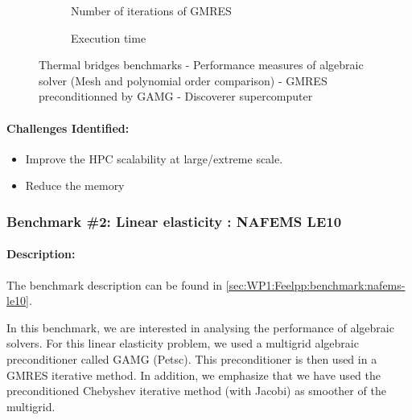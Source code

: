 \begin{figure}
  \begin{subfigure}[c]{\textwidth}
    \centering
    \caption{Number of iterations of GMRES}
  \end{subfigure}
  \begin{subfigure}[c]{\textwidth}
    \centering
    \caption{Execution time}
  \end{subfigure}
  \caption{Thermal bridges benchmarks - Performance measures of algebraic solver
    (Mesh and polynomial order comparison) - GMRES preconditionned by GAMG - Discoverer supercomputer}
  \label{fig:feelpp:wp3:thermal_bridges:performance_measure_all}
\end{figure}


\paragraph{Challenges Identified:} %

\begin{itemize}
\item Improve the HPC scalability at large/extreme scale.
\item Reduce the memory
\end{itemize}

\subsubsection{Benchmark \#2: Linear elasticity : NAFEMS LE10}
\label{sec:WP3:Feelpp:benchmark:nafems-le10}

\paragraph{Description:} %
The benchmark description can be found in
\cref{sec:WP1:Feelpp:benchmark:nafems-le10}.

In this benchmark, we are interested in analysing the performance of algebraic
solvers. For this linear elasticity problem, we used a multigrid algebraic
preconditioner called GAMG (Petsc). This preconditioner is then used in a GMRES
iterative method. In addition, we emphasize that we have used the preconditioned
Chebyshev iterative method (with Jacobi) as smoother of the multigrid.

